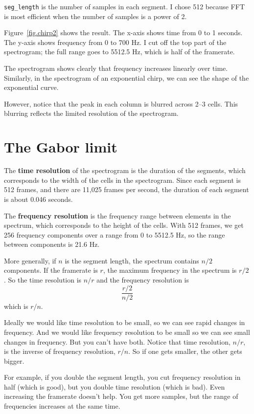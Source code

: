 \documentclass[12pt]{book}
\begin{document}
\verb"seg_length" is the number of samples in each segment.  I chose
512 because FFT is most efficient when the number of samples is a
power of 2.

Figure~\ref{fig.chirp2} shows the result.  The x-axis shows time from
0 to 1 seconds.  The y-axis shows frequency from 0 to 700 Hz.  I cut
off the top part of the spectrogram; the full range goes to 5512.5 Hz,
which is half of the framerate.

The spectrogram shows clearly that frequency increases linearly
over time.  Similarly, in the spectrogram of an exponential chirp, we
can see the shape of the exponential curve.

However, notice that the peak in each column is blurred across 2--3
cells.  This blurring reflects the limited resolution of the
spectrogram.


\section{The Gabor limit}
\label{gabor}

The {\bf time resolution} of the spectrogram is the duration of the
segments, which corresponds to the width of the cells in the
spectrogram.  Since each segment is 512 frames, and there are 11,025
frames per second, the duration of each segment is about 0.046 seconds.

The {\bf frequency resolution} is the frequency range between
elements in the spectrum, which corresponds to the height of the
cells.  With 512 frames, we get 256 frequency components over a range
from 0 to 5512.5 Hz, so the range between components is 21.6 Hz.

More generally, if $n$ is the segment length, the spectrum contains
$n/2$ components.  If the framerate is $r$, the maximum frequency in
the spectrum is $r/2$.  So the time resolution is $n/r$ and the
frequency resolution is
%
\[ \frac{r/2}{n/2} \]
%
which is $r/n$.

Ideally we would like time resolution to be small, so we can see rapid
changes in frequency.  And we would like frequency resolution to be
small so we can see small changes in frequency.  But you can't have
both.  Notice that time resolution, $n/r$, is the inverse of frequency
resolution, $r/n$.  So if one gets smaller, the other gets bigger.

For example, if you double the segment length, you cut frequency
resolution in half (which is good), but you double time resolution
(which is bad).  Even increasing the framerate doesn't help.  You get
more samples, but the range of frequencies increases at
the same time.
\end{document}
